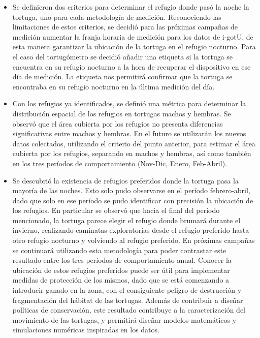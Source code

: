 \begin{itemize}
 
\item Se definieron dos criterios para determinar el refugio donde pasó la noche la tortuga, uno para cada metodología de medición. Reconociendo las limitaciones de estos criterios, se decidió para las próximas campañas de medición aumentar la franja horaria de medición para los datos de i-gotU, de esta manera garantizar la ubicación de la tortuga en el refugio nocturno. Para el caso del tortugómetro se decidió añadir una etiqueta si la tortuga se encuentra en su refugio nocturno a la hora de recuperar el dispositivo en ese día de medición. La etiqueta nos permitirá confirmar que la tortuga se encontraba en su refugio nocturno en la última medición del día.  
 
\item Con los refugios ya identificados, se definió una métrica para determinar la distribución espacial de los refugios en tortugas machos y hembras. Se observó que el área cubierta por los refugios no presenta diferencias significativas entre machos y hembras. En el futuro se utilizarán los nuevos datos colectados, utilizando el criterio del punto anterior, para estimar el área cubierta por los refugios, separando en machos y hembras, así como también en los tres períodos de comportamiento (Nov-Dic, Enero, Feb-Abril). 
 
\item Se descubrió la existencia de refugios preferidos donde la tortuga pasa la mayoría de las noches. Esto solo pudo observarse en el período febrero-abril, dado que solo en ese período se pudo identificar con precisión la ubicación de los refugios. En particular se observó que hacia el final del período mencionado, la tortuga parece elegir el refugio donde brumará durante el invierno, realizando caminatas exploratorias desde el refugio preferido hasta otro refugio nocturno y volviendo al refugio preferido. En próximas campañas se continuará utilizando esta metodología para poder contrastar este resultado entre los tres períodos de comportamiento anual. Conocer la ubicación de estos refugios preferidos puede ser útil para implementar medidas de protección de los mismos, dado que se está comenzando a introducir ganado en la zona, con el consiguiente peligro de destrucción y fragmentación del hábitat de las tortugas. Además de contribuir a diseñar políticas de conservación, este resultado contribuye a la caracterización del movimiento de las tortugas, y permitirá diseñar modelos matemáticos y simulaciones numéricas inspiradas en los datos.
 

\end{itemize}
